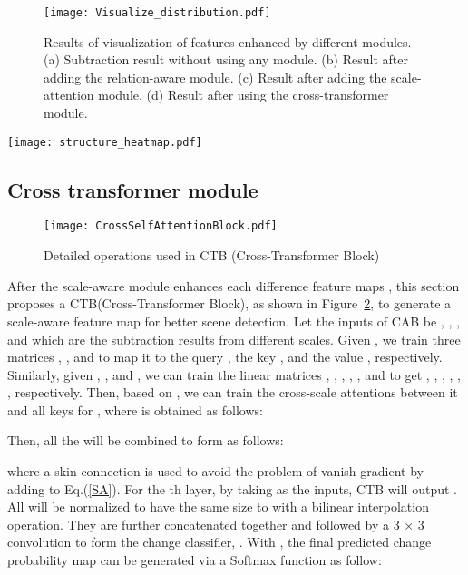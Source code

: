 \documentclass[letterpaper]{article} \usepackage{aaai23}  \usepackage{times}  \usepackage{helvet}  \usepackage{courier}  \usepackage[hyphens]{url}  \usepackage{graphicx} \urlstyle{rm} \def\UrlFont{\rm}  \usepackage{natbib}  \usepackage{caption} \frenchspacing  \setlength{\pdfpagewidth}{8.5in}  \setlength{\pdfpageheight}{11in}  \usepackage{algorithm}
\begin{document}
\begin{figure}[t]
\centering
\texttt{[image: Visualize\_distribution.pdf]}
\caption{ Results of visualization of features enhanced by different modules. (a) Subtraction result without using any module. (b) Result after adding the relation-aware module. (c) Result after adding the scale-attention module. (d) Result after using the cross-transformer module. }
\label{vis_dritub}
\end{figure}
\vspace{0.1cm}

\begin{figure*}[t]
\centering
\texttt{[image: structure\_heatmap.pdf]}
\caption{ Example of SARAS-Net visualization by Gradcam. Red denotes higher attention values and blue denotes lower values. (a) Two input images. (b) Feature maps generated by the relation-aware module. (c) Subtraction results after adding the scale-aware module. (d) Subtraction results after using the cross-transformer module. (e) Prediction and ground truth.}
\vspace{-0.6cm}
\label{Visualize}
\end{figure*}

\subsection{ Cross transformer module}
\begin{figure}[t]
\centering
\texttt{[image: CrossSelfAttentionBlock.pdf]}
\caption{ Detailed operations used in CTB (Cross-Transformer Block)}
\label{cross_tran}
\end{figure}
After the scale-aware module enhances each difference feature maps , this section proposes a CTB(Cross-Transformer Block), as shown in Figure~\ref{cross_tran}, to generate a scale-aware feature map for better scene detection. Let the inputs of CAB be , , , and  which are the subtraction results from different scales. Given  , we train three matrices  , , and  to map  it to the query , the key  , and the value , respectively.  Similarly, given , , and  , we can train the linear matrices , , , , , and  to get , , , , , , respectively.  Then, based on , we can train the cross-scale attentions  between it and all keys  for , where  is obtained as follows:  



Then, all the  will be combined to form  as follows:
  
where a skin connection is used  to avoid the problem of vanish gradient by adding  to Eq.(\ref{SA}). For the th layer, by taking  as the inputs, CTB will output . All  will be normalized to have the same size to  with a bilinear interpolation operation. They are further concatenated together and followed by a 3 × 3 convolution to form the change classifier, . With , the final predicted change probability map  can be generated via a Softmax function as follow:   
\end{document}
